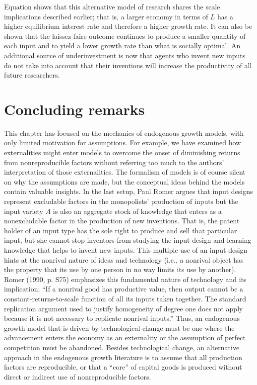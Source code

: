 Equation  shows that this alternative model of research shares the
scale implications described earlier; that is,
 a larger economy in terms of $L$ has
a higher equilibrium interest rate and therefore a higher growth rate. It
can also be shown that the laissez-faire outcome continues to produce a smaller
quantity of each input and to yield a lower growth rate than what is socially optimal.
An additional source of underinvestment is now that agents who invent new inputs
do not take into account that their inventions will increase the productivity
of all future researchers.




\section{Concluding remarks}

This chapter has focused on the mechanics of endogenous
growth models, with only limited  motivation for assumptions.
For example, we have examined how externalities
might enter models to overcome the onset of diminishing returns from
nonreproducible factors without referring too much to the authors'
interpretation of those externalities. The formalism of
models is of course silent on why the assumptions are made, but
the conceptual ideas behind the models contain valuable insights.
In the last setup, Paul Romer
argues that input designs represent excludable factors
in the monopolists' production of inputs but the input variety $A$ is
also an aggregate stock of knowledge that enters as
a nonexcludable factor in the production
of new inventions. That is, the patent holder of an input type
has the sole right to produce and sell that particular input, but she
cannot stop inventors from studying the input design and learning
knowledge that helps to invent new inputs.
This multiple use of an input design hints at the nonrival nature
of ideas and technology (i.e., a nonrival object has the property that
its use by one person in no way limits its use by another).
Romer (1990, p. S75) emphasizes this fundamental nature of technology
and its implication; ``If a nonrival good has productive value, then
output cannot be a constant-returns-to-scale function of all its
inputs taken together. The standard replication argument used to
justify homogeneity of degree one does not apply because it is not
necessary to replicate nonrival inputs.'' Thus, an endogenous
growth model that is driven by technological change must be
one where the advancement enters the economy as an externality or the
assumption of perfect competition must be abandoned. Besides
technological change, an alternative approach in the endogenous
growth literature is to assume that all production factors are
reproducible, or that  a ``core'' of capital goods is  produced without
 direct or indirect use of nonreproducible factors.

